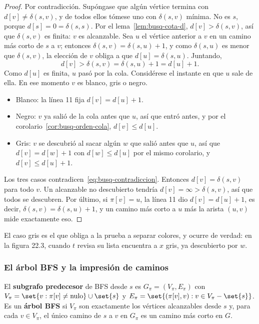 \documentclass[11pt,letterpaper]{article}
\begin{document}
\begin{proof}
  Por contradicción. Supóngase que algún vértice termina con
  $d[v] \neq \delta(s, v)$, y de todos ellos tómese uno con
  $\delta(s, v)$ mínima. No es $s$, porque $d[s] = 0 = \delta(s, s)$.
  Por el lema~\ref{lem:busq-cota-d}, $d[v] > \delta(s, v)$, así que
  $\delta(s, v)$ es finita: $v$ es alcanzable. Sea $u$ el vértice
  anterior a $v$ en un camino más corto de $s$ a $v$; entonces
  $\delta(s, v) = \delta(s, u) + 1$, y como $\delta(s, u)$ es menor
  que $\delta(s, v)$, la elección de $v$ obliga a que
  $d[u] = \delta(s, u)$. Juntando,
  \begin{equation}
    d[v] > \delta(s, v) = \delta(s, u) + 1 = d[u] + 1 .
    \tag{$\ast$} \label{eq:busq-contradiccion}
  \end{equation}
  Como $d[u]$ es finita, $u$ pasó por la cola. Considérese el instante
  en que $u$ sale de ella. En ese momento $v$ es blanco, gris o negro.
  \begin{itemize}[itemsep=0.1em]
    \item Blanco: la línea 11 fija $d[v] = d[u] + 1$.
    \item Negro: $v$ ya salió de la cola antes que $u$, así que entró
      antes, y por el corolario~\ref{cor:busq-orden-cola},
      $d[v] \leq d[u]$.
    \item Gris: $v$ se descubrió al sacar algún $w$ que salió antes
      que $u$, así que $d[v] = d[w] + 1$ con $d[w] \leq d[u]$ por el
      mismo corolario, y $d[v] \leq d[u] + 1$.
  \end{itemize}
  Los tres casos contradicen~\eqref{eq:busq-contradiccion}. Entonces
  $d[v] = \delta(s, v)$ para todo $v$. Un alcanzable no descubierto
  tendría $d[v] = \infty > \delta(s, v)$, así que todos se descubren.
  Por último, si $\pi[v] = u$, la línea 11 dio
  $d[v] = d[u] + 1$, es decir, $\delta(s, v) = \delta(s, u) + 1$, y
  un camino más corto a $u$ más la arista $(u, v)$ mide exactamente
  eso.
\end{proof}

El caso gris es el que obliga a la prueba a separar colores, y
ocurre de verdad: en la figura 22.3, cuando $t$ revisa su lista
encuentra a $x$ gris, ya descubierto por $w$.

\subsubsection*{El árbol BFS y la impresión de caminos}

\begin{definicion}
  El \textbf{subgrafo predecesor} de BFS desde $s$ es
  $G_\pi = (V_\pi, E_\pi)$ con
  $V_\pi = \set{v : \pi[v] \neq \text{nulo}} \cup \set{s}$ y
  $E_\pi = \set{(\pi[v], v) : v \in V_\pi - \set{s}}$. Es un
  \textbf{árbol BFS} si $V_\pi$ son exactamente los vértices
  alcanzables desde $s$ y, para cada $v \in V_\pi$, el único camino de
  $s$ a $v$ en $G_\pi$ es un camino más corto en $G$.
\end{definicion}
\end{document}
